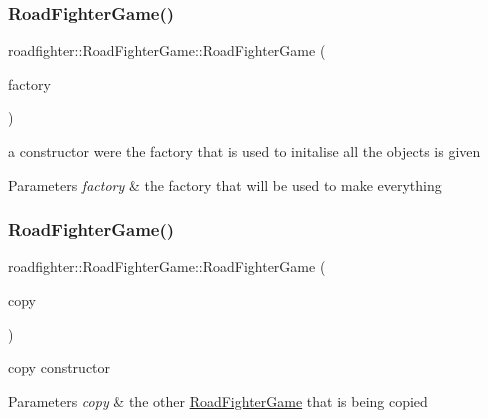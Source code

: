 \subsubsection{\texorpdfstring{Road\+Fighter\+Game()}{RoadFighterGame()}\hspace{0.1cm}{\footnotesize\ttfamily [2/4]}}
{\footnotesize\ttfamily roadfighter\+::\+Road\+Fighter\+Game\+::\+Road\+Fighter\+Game (\begin{DoxyParamCaption}\item[{std\+::shared\+\_\+ptr$<$ \hyperlink{classroadfighter_1_1Entity__Factory__base}{Entity\+\_\+\+Factory\+\_\+base} $>$}]{factory }\end{DoxyParamCaption})\hspace{0.3cm}{\ttfamily [explicit]}}

a constructor were the factory that is used to initalise all the objects is given 
\begin{DoxyParams}{Parameters}
{\em factory} & the factory that will be used to make everything \\
\hline
\end{DoxyParams}
\mbox{\label{classroadfighter_1_1RoadFighterGame_a972a332abf53705ac2e6b11cf4c446aa}} 
\subsubsection{\texorpdfstring{Road\+Fighter\+Game()}{RoadFighterGame()}\hspace{0.1cm}{\footnotesize\ttfamily [3/4]}}
{\footnotesize\ttfamily roadfighter\+::\+Road\+Fighter\+Game\+::\+Road\+Fighter\+Game (\begin{DoxyParamCaption}\item[{const \hyperlink{classroadfighter_1_1RoadFighterGame}{Road\+Fighter\+Game} \&}]{copy }\end{DoxyParamCaption})\hspace{0.3cm}{\ttfamily [default]}}

copy constructor 
\begin{DoxyParams}{Parameters}
{\em copy} & the other \hyperlink{classroadfighter_1_1RoadFighterGame}{Road\+Fighter\+Game} that is being copied \\
\hline
\end{DoxyParams}
\mbox{\label{classroadfighter_1_1RoadFighterGame_ad5801b8550efd5b3c8b2029b5b11bd34}} 
